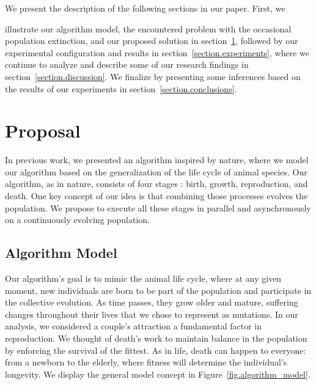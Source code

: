 \documentclass[graybox]{svmult}
\begin{document}
    We present the description of the following sections in our paper. First, we %

    illustrate our algorithm model, the encountered problem with the occasional
    population extinction, and our proposed solution in
    section~\ref{section.proposal}, followed by our experimental configuration and
    results in section~\ref{section.experiments}, where we continue to analyze and
    describe some of our research findings in section~\ref{section.discussion}. We
    finalize by presenting some inferences based on the results of our experiments
    in section~\ref{section.conclusions}.

\section{Proposal}
    \label{section.proposal}

    In previous work, we presented an algorithm inspired by nature, where we %
    model our algorithm based on
    the generalization of the life cycle of animal species. Our algorithm, as
    in nature, consists of four stages \cite{read1968system}: birth, growth,
    reproduction, and death. One key concept of our idea is that combining
    those processes evolves the population. We propose to execute all these
    stages in parallel and asynchronously on a continuously evolving
    population.


    \subsection{Algorithm Model}
        

        Our algorithm's goal is to mimic the animal life cycle, where at any
        given moment, new individuals are born to be part of the population and
        participate in the collective evolution. As time passes, they grow
        older and mature, suffering changes throughout their lives that we
        chose to represent as mutations. In our analysis, we considered a
        couple's attraction a fundamental factor in reproduction. We thought of
        death's work to maintain balance in the population by enforcing the
        survival of the fittest. As in life, death can happen to everyone: from
        a newborn to the elderly, where fitness will determine the individual's
        longevity. We display the general model concept in
        Figure~\ref{fig.algorithm_model}.
\end{document}
